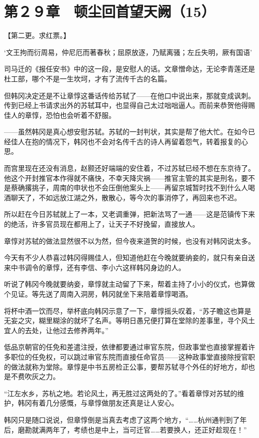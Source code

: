 \section{第２９章　顿尘回首望天阙（15）}

【第二更。求红票。】

‘文王拘而衍周易，仲尼厄而著春秋；屈原放逐，乃赋离骚；左丘失明，厥有国语’

司马迁的《报任安书》中的这一段，是安慰人的话。文章憎命达，无论李青莲还是杜工部，哪个不是一生坎坷，才有了流传千古的名篇。

但韩冈决定还是不让章惇这番话传给苏轼了——在他口中说出来，那就变成讽刺。传到已经上书请求出外的苏轼耳中，也显得自己太过咄咄逼人。而前来恭贺他得赐佳人的章惇，恐怕也会听着不舒服。

——虽然韩冈是真心想安慰苏轼。苏轼的一封判状，其实是帮了他大忙。在如今已经佳人在抱的情况下，韩冈也不会对名传千古的诗人再留着怨气，转着报复的心思。

而宫里现在还没有消息，赵颢还好端端的安住着，不过苏轼已经不想在东京待了。他这个开封推官本作得就不痛快，不幸天降灾祸——推官主管的其实是刑名，要不是蔡确撂挑子，周南的申状也不会压倒他案头上——再留京城暂时找不到什么人喝酒聊天了，不如远放江湖之外，散散心，等今次的事消停了，再回来也不迟。

所以赶在今日苏轼就上了一本，又老调重弹，把新法骂了一通——这是范镇传下来的绝活，许多官员现在都用上了，让天子不好挽留，直接放人。

章惇对苏轼的做法显然很不以为然，但今夜来道贺的时候，也没有对韩冈说太多。

今天有不少人恭喜过韩冈得赐佳人，但知道他赶在今晚就要纳妾的，就只有亲自送来中书调令的章惇，还有李信、李小六这样韩冈身边的人。

听说了韩冈今晚就要纳妾，章惇就主动留了下来，帮着主持了小小的仪式，也算做个见证。等先送了周南入洞房，韩冈就坐下来陪着章惇喝酒。

将杯中酒一饮而尽，举杯底向韩冈示意了一下，章惇摇头叹着，“苏子瞻这也算是无妄之灾，糊里糊涂的就坏了名声。等明日愚兄便打算在堂除的差事里，寻个风土宜人的去处，让他过去修养两年。”

低品京朝官的任免和差遣注授，依律都要通过审官东院，但政事堂也直接掌握着许多职位的任免权，可以跳过审官东院而直接任命官员——这种政事堂直接除授官职的做法就称为堂除。章惇是中书五房检正公事，要帮苏轼寻个外任的好地方，却也是不费吹灰之力。

“江左水乡，苏杭之地。若论风土，再无胜过这两处的了。”看着章惇对苏轼的维护，韩冈有着几分感慨，与章惇做朋友还真是让人安心。

韩冈只是随口说说，但章惇倒是当真去考虑了这两个地方，“……杭州通判到了年后，磨勘就满两年了，考绩也是中上，当可迁官……若要换人，还正好趁现在！”

